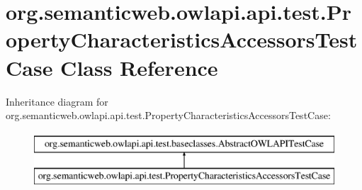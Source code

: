 \hypertarget{classorg_1_1semanticweb_1_1owlapi_1_1api_1_1test_1_1_property_characteristics_accessors_test_case}{\section{org.\-semanticweb.\-owlapi.\-api.\-test.\-Property\-Characteristics\-Accessors\-Test\-Case Class Reference}
\label{classorg_1_1semanticweb_1_1owlapi_1_1api_1_1test_1_1_property_characteristics_accessors_test_case}
}
Inheritance diagram for org.\-semanticweb.\-owlapi.\-api.\-test.\-Property\-Characteristics\-Accessors\-Test\-Case\-:\begin{figure}[H]
\begin{center}
\leavevmode
\includegraphics[height=2.000000cm]{classorg_1_1semanticweb_1_1owlapi_1_1api_1_1test_1_1_property_characteristics_accessors_test_case}
\end{center}
\end{figure}

